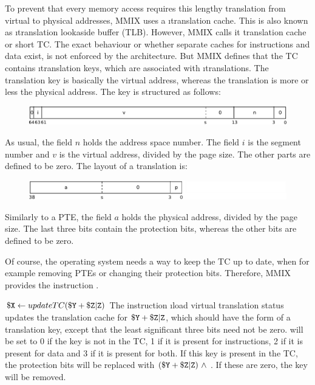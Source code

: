 To prevent that every memory access requires this lengthy translation from virtual to physical addresses, MMIX uses a \i{translation cache}. This is also known as \i{translation lookaside buffer} (TLB). However, MMIX calls it translation cache or short TC. The exact behaviour or whether separate caches for instructions and data exist, is not enforced by the architecture. But MMIX defines that the TC contains \i{translation keys}, which are associated with \i{translations}. The translation key is basically the virtual address, whereas the translation is more or less the physical address. The key is structured as follows:
\begin{figure}[H]
	\centering
	\includegraphics[width=\textwidth]{img/TC-key-crop.pdf}
\end{figure}
\vspace{-20pt}
\noindent As usual, the field $n$ holds the address space number. The field $i$ is the segment number and $v$ is the virtual address, divided by the page size. The other parts are defined to be zero. The layout of a translation is:
\begin{figure}[H]
	\centering
	\includegraphics[width=\textwidth]{img/TC-trans-crop.pdf}
\end{figure}
\vspace{-20pt}
\noindent Similarly to a PTE, the field $a$ holds the physical address, divided by the page size. The last three bits contain the protection bits, whereas the other bits are defined to be zero. \citep[pg. 37]{mmix-doc}

Of course, the operating system needs a way to keep the TC up to date, when for example removing PTEs or changing their protection bits. Therefore, MMIX provides the instruction .

\instrtbl
	{}
	{${\tt \$X} \leftarrow updateTC({\tt \$Y} + {\tt \$Z}{\tt|Z})$}
\noindent The instruction \i{load virtual translation status} updates the translation cache for ${\tt \$Y} + {\tt \$Z}{\tt|Z}$, which should have the form of a translation key, except that the least significant three bits need not be zero.  will be set to 0 if the key is not in the TC, 1 if it is present for instructions, 2 if it is present for data and 3 if it is present for both. If this key is present in the TC, the protection bits will be replaced with $({\tt \$Y} + {\tt \$Z}{\tt|Z})~\land~$. If these are zero, the key will be removed. \citep[pg. 37]{mmix-doc}

